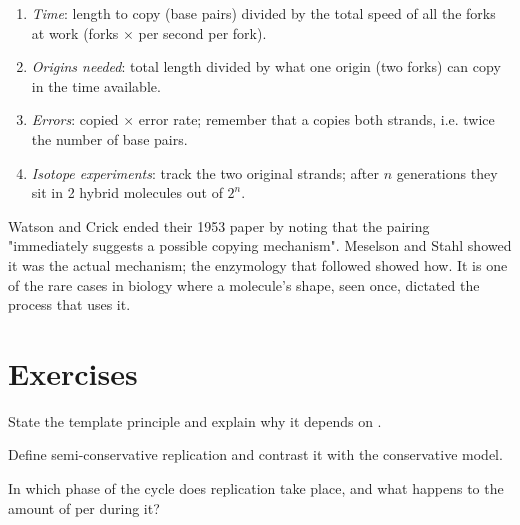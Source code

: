 \begin{method}\label{met:g11:dna-replication:calc}
\begin{enumerate}
  \item \emph{Time}: length to copy (base pairs) divided by the total
        speed of all the forks at work (forks $\times$  per
        second per fork).
  \item \emph{Origins needed}: total length divided by what one origin
        (two forks) can copy in the time available.
  \item \emph{Errors}:  copied $\times$ error rate; remember
        that a  copies both strands, i.e. twice the number of base
        pairs.
  \item \emph{Isotope experiments}: track the two original strands;
        after $n$ generations they sit in 2 hybrid molecules out of
        $2^n$.
\end{enumerate}
\end{method}

\begin{remark}\label{rem:g11:dna-replication:fit}
Watson and Crick ended their 1953 paper by noting that the pairing
"immediately suggests a possible copying mechanism". Meselson and Stahl
showed it was the actual mechanism; the enzymology that followed
showed how. It is one of the rare cases in biology where a molecule's
shape, seen once, dictated the process that uses it.
\end{remark}

\section{Exercises}

\begin{exercise}[$\star$]\label{exo:g11:dna-replication:1}
State the template principle and explain why it depends on
.
\end{exercise}

\begin{exercise}[$\star$]\label{exo:g11:dna-replication:2}
Define semi-conservative replication and contrast it with the
conservative model.
\end{exercise}

\begin{exercise}[$\star$]\label{exo:g11:dna-replication:3}
In which phase of the  cycle does replication take place, and what
happens to the amount of  per  during it?
\end{exercise}

